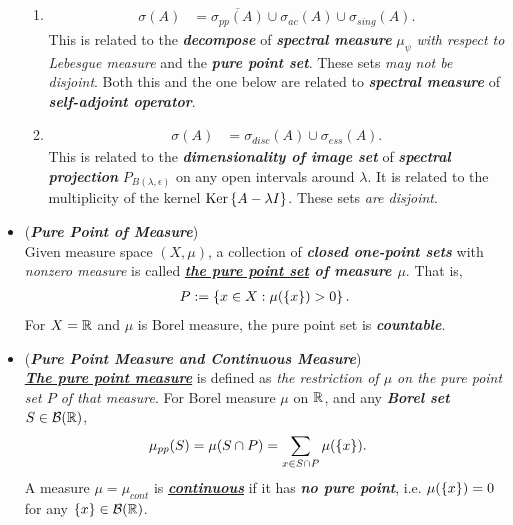 \documentclass[11pt]{article}
\begin{document}
\begin{itemize}
\begin{remark}
\begin{enumerate}
\item  \begin{align*}
\sigma(A) &= \overline{\sigma_{pp}(A) } \cup \sigma_{ac}(A)  \cup \sigma_{sing}(A).
\end{align*} This is related to the \emph{\textbf{decompose}} of  \emph{\textbf{spectral measure}} $\mu_{\psi}$ \emph{with respect to Lebesgue measure} and the \emph{\textbf{pure point set}}. These sets \emph{may not be disjoint}. Both this and the one below are related to \emph{\textbf{spectral measure}} of \emph{\textbf{self-adjoint operator}}.

\item \begin{align*}
\sigma(A)&= \sigma_{disc}(A) \cup \sigma_{ess}(A).
\end{align*} This is related to the \emph{\textbf{dimensionality of image set}} of  \emph{\textbf{spectral projection}} $P_{B(\lambda, \epsilon)}$ on any open intervals around $\lambda$. It is related to the multiplicity of the kernel $\text{Ker}\left\{A - \lambda I\right\}$. These sets \emph{are disjoint}. 
\end{enumerate}
\end{remark}

\item \begin{definition} (\emph{\textbf{Pure Point of Measure}})\\
Given measure space $(X, \mu)$, a collection of \emph{\textbf{closed one-point sets}} with \emph{nonzero measure} is called \emph{\textbf{\underline{the pure point set} of measure $\mu$}}. That is,
\begin{align*}
P := \left\{x \in X:  \mu(\left\{x\right\}) >0 \right\}.
\end{align*} For $X = {\mathbb R}$ and $\mu$ is Borel measure, the pure point set is \emph{\textbf{countable}}.
\end{definition}

\item \begin{definition} (\emph{\textbf{Pure Point Measure and Continuous Measure}})\\
\emph{\textbf{\underline{The pure point measure}}} is defined as \emph{the restriction of $\mu$ on the pure point set $P$ of that measure}. For Borel measure $\mu$ on ${\mathbb R}$, and any \emph{\textbf{Borel set}} $S \in {\mathcal B}({\mathbb R})$, 
\begin{align*}
\mu_{pp}(S) &= \mu(S \cap P) = \sum_{x \in S\cap P}\mu(\left\{x\right\}).
\end{align*} A measure $\mu = \mu_{cont}$ is \emph{\textbf{\underline{continuous}}} if it has \emph{\textbf{no pure point}}, i.e. $\mu(\left\{x\right\}) = 0$ for any $\left\{x\right\} \in {\mathcal B}({\mathbb R})$.


\end{definition}
\end{itemize}
\end{document}
